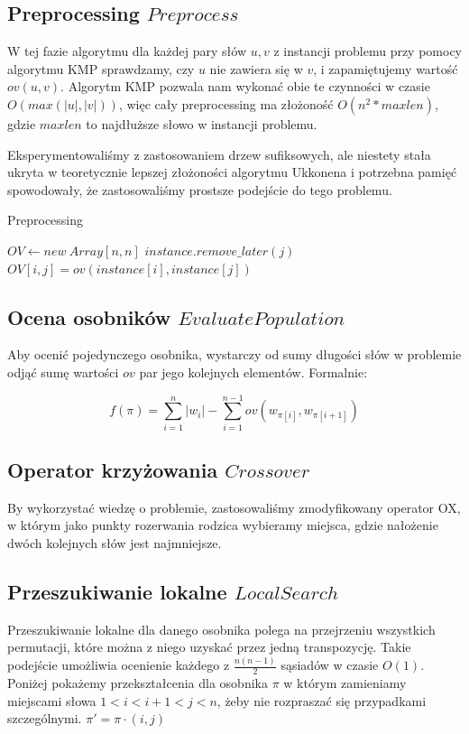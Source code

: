 \documentclass[11pt, a4wide]{mwart}
\begin{document}
\subsection{Preprocessing $Preprocess$}
W tej fazie algorytmu dla każdej pary słów $u, v$ z instancji problemu 
przy pomocy algorytmu KMP \cite{jewels} sprawdzamy, czy $u$ nie zawiera się w
$v$, i zapamiętujemy wartość $ov(u, v)$. Algorytm KMP pozwala nam wykonać obie
te czynności w czasie $O(max(|u|, |v|))$, więc cały preprocessing ma złożoność
$O(n ^ 2 * maxlen)$, gdzie $maxlen$ to najdłuższe słowo w instancji problemu.

Eksperymentowaliśmy z zastosowaniem drzew sufiksowych, ale niestety stała
ukryta w teoretycznie lepszej złożoności algorytmu Ukkonena \cite{ukkonen} i
potrzebna pamięć spowodowały, że zastosowaliśmy prostsze podejście do tego
problemu.

\begin{algorithm}[H]
\caption{Preprocessing}
\label{preprocessing}
\begin{algorithmic}
  \State $OV \gets new\ Array[n, n]$
        \State $instance.remove\_later(j)$
      \EndIf
      \State $OV[i, j] = ov(instance[i], instance[j])$
    \EndFor
  \EndFor
  \EndFunction
\end{algorithmic}
\end{algorithm}


\subsection{Ocena osobników $EvaluatePopulation$}
Aby ocenić pojedynczego osobnika, wystarczy od sumy długości słów w problemie
odjąć sumę wartości $ov$ par jego kolejnych elementów. Formalnie:

$$ f(\pi) = \sum\limits_{i = 1}^n |w_i| - \sum\limits_{i = 1}^{n - 1} ov(w_{\pi[i]}, w_{\pi[i + 1]})$$


\subsection{Operator krzyżowania $Crossover$}
By wykorzystać wiedzę o problemie, zastosowaliśmy zmodyfikowany operator OX, w
którym jako punkty rozerwania rodzica wybieramy miejsca, gdzie nałożenie dwóch
kolejnych słów jest najmniejsze.


\subsection{Przeszukiwanie lokalne $LocalSearch$}
Przeszukiwanie lokalne dla danego osobnika polega na przejrzeniu wszystkich
permutacji, które można z niego uzyskać przez jedną transpozycję. Takie
podejście umożliwia ocenienie każdego z $\frac{n(n-1)}{2}$ sąsiadów w czasie $O(1)$.
Poniżej pokażemy przekształcenia dla osobnika $\pi$ w którym zamieniamy
miejscami słowa $1 < i < i+1 < j < n$, żeby nie rozpraszać się przypadkami
szczególnymi. $\pi' = \pi \cdot (i, j)$
\end{document}
